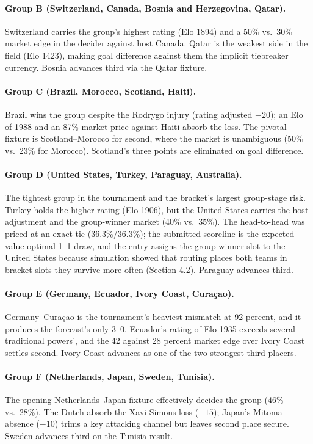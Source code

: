 \documentclass[11pt,a4paper]{article}
\begin{document}
\paragraph{Group B (Switzerland, Canada, Bosnia and Herzegovina, Qatar).} Switzerland carries the group's highest rating (Elo 1894) and a 50\% vs.\ 30\% market edge in the decider against host Canada. Qatar is the weakest side in the field (Elo 1423), making goal difference against them the implicit tiebreaker currency. Bosnia advances third via the Qatar fixture.

\paragraph{Group C (Brazil, Morocco, Scotland, Haiti).} Brazil wins the group despite the Rodrygo injury (rating adjusted $-20$); an Elo of 1988 and an 87\% market price against Haiti absorb the loss. The pivotal fixture is Scotland--Morocco for second, where the market is unambiguous (50\% vs.\ 23\% for Morocco). Scotland's three points are eliminated on goal difference.

\paragraph{Group D (United States, Turkey, Paraguay, Australia).} The tightest group in the tournament and the bracket's largest group-stage risk. Turkey holds the higher rating (Elo 1906), but the United States carries the host adjustment and the group-winner market (40\% vs.\ 35\%). The head-to-head was priced at an exact tie (36.3\%/36.3\%); the submitted scoreline is the expected-value-optimal 1--1 draw, and the entry assigns the group-winner slot to the United States because simulation showed that routing places both teams in bracket slots they survive more often (Section 4.2). Paraguay advances third.

\paragraph{Group E (Germany, Ecuador, Ivory Coast, Curaçao).} Germany--Curaçao is the tournament's heaviest mismatch at 92 percent, and it produces the forecast's only 3--0. Ecuador's rating of Elo 1935 exceeds several traditional powers', and the 42 against 28 percent market edge over Ivory Coast settles second. Ivory Coast advances as one of the two strongest third-placers.

\paragraph{Group F (Netherlands, Japan, Sweden, Tunisia).} The opening Netherlands--Japan fixture effectively decides the group (46\% vs.\ 28\%). The Dutch absorb the Xavi Simons loss ($-15$); Japan's Mitoma absence ($-10$) trims a key attacking channel but leaves second place secure. Sweden advances third on the Tunisia result.
\end{document}

